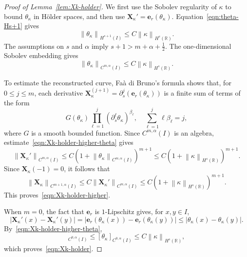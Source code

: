 \documentclass[11pt,reqno]{amsart}
\theoremstyle{plain}
\theoremstyle{definition}
\numberwithin{equation}{section}
\newcommand{\paren}[1]{\left(#1\right)}
\newcommand{\p}{\partial}
\newcommand{\bm}[1]{\boldsymbol{#1}}
\newcommand{\abs}[1]{\left\lvert #1 \right\rvert}
\newcommand{\norm}[1]{\left\lVert #1 \right\rVert}
\newcommand{\R}{\mathbb{R}}
\newcommand{\xk}{\bm X_\kappa}
\newcommand{\ci}[1]{C^{#1}(I)}
\newcommand{\hi}[1]{H^{#1}(I)}
\newcommand{\hr}[1]{H^{#1}(\R)}
\begin{document}
\begin{proof}[Proof of Lemma~\ref{lem:Xk-holder}]
We first use the Sobolev regularity of $\kappa$ to bound
$\theta_\kappa$ in H\"older spaces, and then use
$\xk'=\bm e_r(\theta_\kappa)$. Equation~\eqref{eqn:theta-Hs+1} gives
\begin{equation}
    \norm{\theta_\kappa}_{\hi{s+1}} \le C\norm{\kappa}_{\hr{s}}.
\end{equation}
The assumptions on $s$ and $\alpha$ imply
$s+1>m+\alpha+\frac{1}{2}$. The one-dimensional Sobolev embedding gives
\begin{equation}\label{eqn:Xk-holder-higher-theta}
    \norm{\theta_\kappa}_{\ci{m,\alpha}} \le C\norm{\kappa}_{\hr{s}}.
\end{equation}

To estimate the reconstructed curve, Fa\`a di Bruno's formula shows that,
for $0\le j\le m$, each derivative
$\xk^{(j+1)}=\p_s^j(\bm e_r(\theta_\kappa))$ is a finite sum of terms of the
form
\begin{equation}
    G\paren{\theta_\kappa}\prod_{\ell=1}^j \paren{\p_s^\ell\theta_\kappa}^{\beta_\ell},
    \quad
    \sum_{\ell=1}^j \ell\beta_\ell = j,
\end{equation}
where $G$ is a smooth bounded function. Since $\ci{m,\alpha}$ is an algebra,
estimate~\eqref{eqn:Xk-holder-higher-theta} gives
\begin{equation}
    \norm{\xk'}_{\ci{m,\alpha}}
    \le C\paren{1+\norm{\theta_\kappa}_{\ci{m,\alpha}}}^{m+1}
    \le C\paren{1+\norm{\kappa}_{\hr{s}}}^{m+1}.
\end{equation}
Since $\xk(-1)=0$, it follows that
\begin{equation}
    \norm{\xk}_{\ci{m+1,\alpha}}
    \le C \norm{\xk'}_{\ci{m,\alpha}}
    \le C\paren{1+\norm{\kappa}_{\hr{s}}}^{m+1}.
\end{equation}
This proves~\eqref{eqn:Xk-holder-higher}.

When $m=0$, the fact that $\bm e_r$ is $1$-Lipschitz gives, for $x,y\in I$,
\begin{equation}
    \abs{\xk'(x)-\xk'(y)}
    = \abs{\bm e_r(\theta_\kappa(x))-\bm e_r(\theta_\kappa(y))}
    \le \abs{\theta_\kappa(x)-\theta_\kappa(y)}.
\end{equation}
By~\eqref{eqn:Xk-holder-higher-theta},
\begin{equation}
    [\xk']_{\ci{0,\alpha}} \le [\theta_\kappa]_{\ci{0,\alpha}}
    \le C\norm{\kappa}_{\hr{s}},
\end{equation}
which proves~\eqref{eqn:Xk-holder}.


\end{proof}
\end{document}
